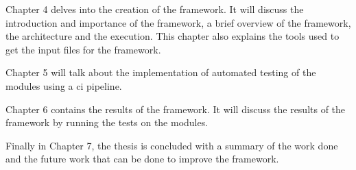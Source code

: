 Chapter 4 delves into the creation of the framework. It will discuss the introduction and importance of the framework, a brief overview of the framework,
the architecture and the execution. This chapter also explains the tools used to get the input files for the framework.

Chapter 5 will talk about the implementation of automated testing of the modules using a \acrlong{ci} pipeline.

Chapter 6 contains the results of the framework. It will discuss the results of the framework by running the tests on the modules.

Finally in Chapter 7, the thesis is concluded with a summary of the work done and the future work that can be done to improve the framework. 